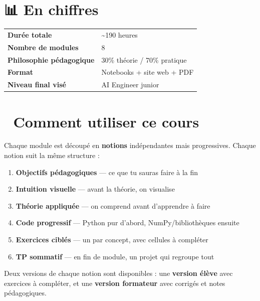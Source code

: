 \documentclass[
  french,
  11pt,
  a4paper,
]{scrbook}
\newcounter{none} %
\providecommand{\tightlist}{%
  \setlength{\itemsep}{0pt}\setlength{\parskip}{0pt}}
\begin{document}
\section{📊 En chiffres}\label{en-chiffres}

{\def\LTcaptype{none} %
\begin{longtable}[]{@{}ll@{}}
\toprule\noalign{}
\endhead
\bottomrule\noalign{}
\endlastfoot
\textbf{Durée totale} & \textasciitilde190 heures \\
\textbf{Nombre de modules} & 8 \\
\textbf{Philosophie pédagogique} & 30\% théorie / 70\% pratique \\
\textbf{Format} & Notebooks + site web + PDF \\
\textbf{Niveau final visé} & AI Engineer junior \\
\end{longtable}
}

\section{🎯 Comment utiliser ce cours}\label{comment-utiliser-ce-cours}

Chaque module est découpé en \textbf{notions} indépendantes mais
progressives. Chaque notion suit la même structure :

\begin{enumerate}
\def\labelenumi{\arabic{enumi}.}
\tightlist
\item
  \textbf{Objectifs pédagogiques} --- ce que tu sauras faire à la fin
\item
  \textbf{Intuition visuelle} --- avant la théorie, on visualise
\item
  \textbf{Théorie appliquée} --- on comprend avant d'apprendre à faire
\item
  \textbf{Code progressif} --- Python pur d'abord, NumPy/bibliothèques
  ensuite
\item
  \textbf{Exercices ciblés} --- un par concept, avec cellules à
  compléter
\item
  \textbf{TP sommatif} --- en fin de module, un projet qui regroupe tout
\end{enumerate}

\begin{tcolorbox}[enhanced jigsaw, arc=.35mm, bottomrule=.15mm, bottomtitle=1mm, breakable, colback=white, colbacktitle=quarto-callout-note-color!10!white, colframe=quarto-callout-note-color-frame, coltitle=black, left=2mm, leftrule=.75mm, opacityback=0, opacitybacktitle=0.6, rightrule=.15mm, title=\textcolor{quarto-callout-note-color}{\faInfo}\hspace{0.5em}{Pour les formateurs}, titlerule=0mm, toprule=.15mm, toptitle=1mm]

Deux versions de chaque notion sont disponibles : une \textbf{version
élève} avec exercices à compléter, et une \textbf{version formateur}
avec corrigés et notes pédagogiques.

\end{tcolorbox}
\end{document}
